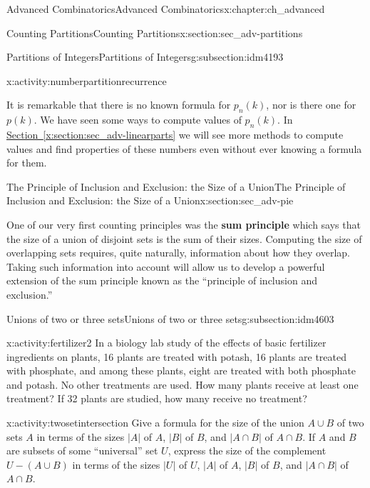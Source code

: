 \documentclass[oneside,10pt,]{book}
\newcommand{\terminology}[1]{\textbf{#1}}
\numberwithin{equation}{chapter}
\begin{document}
\begin{chapterptx}{Advanced Combinatorics}{}{Advanced Combinatorics}{}{}{x:chapter:ch_advanced}
\begin{sectionptx}{Counting Partitions}{}{Counting Partitions}{}{}{x:section:sec_adv-partitions}
\begin{subsectionptx}{Partitions of Integers}{}{Partitions of Integers}{}{}{g:subsection:idm4193}
\begin{activity}{}{x:activity:numberpartitionrecurrence}
\end{activity}
It is remarkable that there is no known formula for \(p_n(k)\), nor is there one for \(p(k)\). We have seen some ways to compute values of \(p_n(k)\).  In \hyperref[x:section:sec_adv-linearparts]{Section~\ref{x:section:sec_adv-linearparts}} we will see more methods to compute values and find properties of these numbers even without ever knowing a formula for them.%
\end{subsectionptx}
\end{sectionptx}
%
%
\typeout{************************************************}
\typeout{************************************************}
%
\begin{sectionptx}{The Principle of Inclusion and Exclusion: the Size of a Union}{}{The Principle of Inclusion and Exclusion: the Size of a Union}{}{}{x:section:sec_adv-pie}
\begin{introduction}{}%
One of our very first counting principles was the \terminology{sum principle} which says that the size of a union of disjoint sets is the sum of their sizes. Computing the size of overlapping sets requires, quite naturally, information about how they overlap. Taking such information into account will allow us to develop a powerful extension of the sum principle known as the ``principle of inclusion and exclusion.''%
\end{introduction}%
%
%
\typeout{************************************************}
\typeout{************************************************}
%
\begin{subsectionptx}{Unions of two or three sets}{}{Unions of two or three sets}{}{}{g:subsection:idm4603}
\begin{activity}{}{x:activity:fertilizer2}%
In a biology lab study of the effects of basic fertilizer ingredients on plants, 16 plants are treated with potash, 16 plants are treated with phosphate, and among these plants, eight are treated with both phosphate and potash. No other treatments are used. How many plants receive at least one treatment? If 32 plants are studied, how many receive no treatment?%
\end{activity}
\begin{activity}{}{x:activity:twosetintersection}%
Give a formula for the size of the union \(A\cup B\) of two sets \(A\) in terms of the sizes \(|A|\) of \(A\), \(|B|\) of \(B\), and \(|A\cap B|\) of \(A\cap B\). If \(A\) and \(B\) are subsets of some ``universal'' set \(U\), express the size of the complement \(U-(A\cup B)\) in terms of the sizes \(|U|\) of \(U\), \(|A|\) of \(A\), \(|B|\) of \(B\), and \(|A\cap B|\) of \(A\cap B\).%

\end{activity}
\end{subsectionptx}
\end{sectionptx}
\end{chapterptx}
\end{document}

